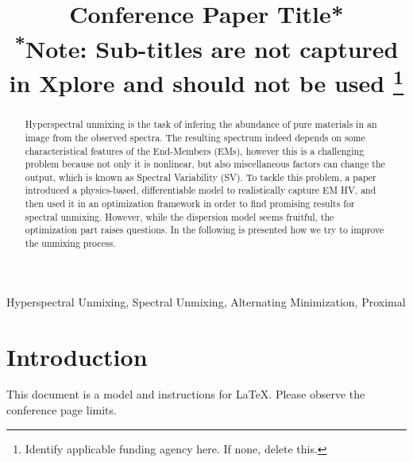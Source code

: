 \documentclass[conference]{IEEEtran}
\begin{document}
\title{Conference Paper Title*\\
{\footnotesize \textsuperscript{*}Note: Sub-titles are not captured in Xplore and
should not be used}
\thanks{Identify applicable funding agency here. If none, delete this.}
}

\author{
\and
{}
}

\maketitle

\begin{abstract}
  Hyperspectral unmixing is the task of infering the abundance of pure materials in an image from the observed spectra. The resulting spectrum indeed depends on some characteristical features of the End-Members (EMs), however this is a challenging problem because not only it is nonlinear, but also miscellaneous factors can change the output, which is known as Spectral Variability (SV). To tackle this problem, a paper \cite{janiczek_differentiable_2020} introduced a physics-based, differentiable model to realistically capture EM HV, and then used it in an optimization framework in order to find promising results for spectral unmixing. However, while the dispersion model seems fruitful, the optimization part raises questions. In the following is presented how we try to improve the unmixing process.
\end{abstract}

\begin{IEEEkeywords}
Hyperspectral Unmixing, Spectral Unmixing, Alternating Minimization, Proximal
\end{IEEEkeywords}

\section{Introduction}
This document is a model and instructions for \LaTeX.
Please observe the conference page limits. 
\end{document}
